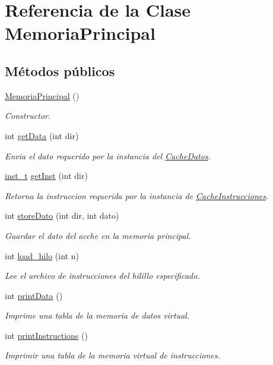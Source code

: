 \hypertarget{classMemoriaPrincipal}{}\section{Referencia de la Clase Memoria\+Principal}
\label{classMemoriaPrincipal}
\subsection*{Métodos públicos}
\begin{DoxyCompactItemize}
\item 
\hyperlink{classMemoriaPrincipal_a1ffb9d5ffec05ed9bd0fc5c3ca51d200}{Memoria\+Principal} ()
\begin{DoxyCompactList}\small\item\em Constructor. \end{DoxyCompactList}\item 
int \hyperlink{classMemoriaPrincipal_aaf5f5abab3ddb40a88c9c695c02d29d3}{get\+Data} (int dir)
\begin{DoxyCompactList}\small\item\em Envia el dato requerido por la instancia del \hyperlink{classCacheDatos}{Cache\+Datos}. \end{DoxyCompactList}\item 
\hyperlink{structinst__t}{inst\+\_\+t} \hyperlink{classMemoriaPrincipal_a0ffe52092ed587006788f4c3d8965f47}{get\+Inst} (int dir)
\begin{DoxyCompactList}\small\item\em Retorna la instruccion requerida por la instancia de \hyperlink{classCacheInstrucciones}{Cache\+Instrucciones}. \end{DoxyCompactList}\item 
int \hyperlink{classMemoriaPrincipal_a0334ed61e40292259985655430efad33}{store\+Dato} (int dir, int dato)
\begin{DoxyCompactList}\small\item\em Guardar el dato del acche en la memoria principal. \end{DoxyCompactList}\item 
int \hyperlink{classMemoriaPrincipal_a5262cc20950dd1b8fafd3d0dae36237f}{load\+\_\+hilo} (int n)
\begin{DoxyCompactList}\small\item\em Lee el archivo de instrucciones del hilillo especificado. \end{DoxyCompactList}\item 
int \hyperlink{classMemoriaPrincipal_a0f07dc1a0723d5403a176f311a27ed1a}{print\+Data} ()
\begin{DoxyCompactList}\small\item\em Imprime una tabla de la memoria de datos virtual. \end{DoxyCompactList}\item 
int \hyperlink{classMemoriaPrincipal_ae7d66a00cbcbd3a51d99d1ec89bb26b5}{print\+Instructions} ()
\begin{DoxyCompactList}\small\item\em Imprimir una tabla de la memoria virtual de instrucciones. \end{DoxyCompactList}\end{DoxyCompactItemize}
